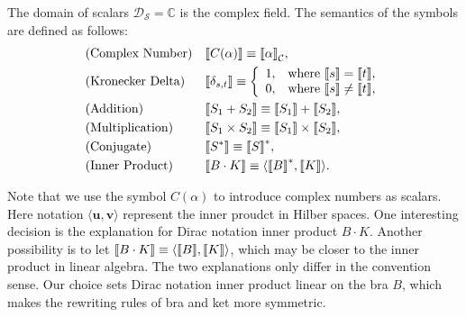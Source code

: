\begin{definition}
  The domain of scalars $\mathcal{D}_\mathcal{S} = \mathbb{C}$ is the complex field.
  The semantics of the symbols are defined as follows:
  \begin{align*}
    & \text{(Complex Number)} &&
    {\llbracket C(\alpha) \rrbracket} \equiv {\llbracket \alpha \rrbracket}_\mathcal{C}, \\
    & \text{(Kronecker Delta)} &&
    {\llbracket \delta_{s, t} \rrbracket} \equiv \left\{
      \begin{array}{ll}
        1, & \text{where } {\llbracket s \rrbracket} = {\llbracket t \rrbracket}, \\
        0, & \text{where } {\llbracket s \rrbracket} \neq {\llbracket t \rrbracket}, 
      \end{array}
    \right. \\
    & \text{(Addition)} &&
    {\llbracket S_1 + S_2 \rrbracket} \equiv {\llbracket S_1 \rrbracket} + {\llbracket S_2 \rrbracket}, \\
    & \text{(Multiplication)} &&
    {\llbracket S_1 \times S_2 \rrbracket} \equiv {\llbracket S_1 \rrbracket} \times {\llbracket S_2 \rrbracket}, \\
    & \text{(Conjugate)} &&
    {\llbracket S^* \rrbracket} \equiv {\llbracket S \rrbracket}^*, \\
    & \text{(Inner Product)} &&
    {\llbracket B \cdot K \rrbracket} \equiv \langle {\llbracket B \rrbracket}^*, {\llbracket K \rrbracket} \rangle.
  \end{align*}
\end{definition}

Note that we use the symbol $C(\alpha)$ to introduce complex numbers as scalars.
Here notation $\langle \boldsymbol{u} , \boldsymbol{v} \rangle$ represent the inner proudct in Hilber spaces.
One interesting decision is the explanation for Dirac notation inner product $B \cdot K$. Another possibility is to let ${\llbracket B \cdot K \rrbracket} \equiv \langle {\llbracket B \rrbracket}, {\llbracket K \rrbracket} \rangle$, which may be closer to the inner product in linear algebra. The two explanations only differ in the convention sense. Our choice sets Dirac notation inner product linear on the bra $B$, which makes the rewriting rules of bra and ket more symmetric.


